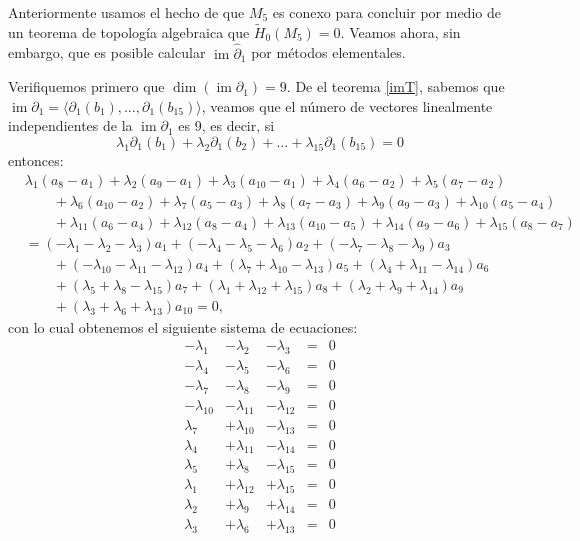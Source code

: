 \documentclass[12pt]{book}
\theoremstyle{definition}
\DeclareMathOperator{\im}{im}
\newcounter{in}
\begin{document}
Anteriormente usamos el hecho de que $M_{5}$ es conexo para concluir
por medio de un teorema de topología algebraica que $\widetilde
H_{0}(M_{5})=0$. Veamos ahora, sin embargo, que es posible
calcular $\im \widehat\partial_{1}$ por métodos elementales.

Verifiquemos primero que $\dim(\im \partial_{1})=9$. De el teorema
\ref{imT}, sabemos que
$\im \partial_{1}=\langle\partial_{1}(b_{1}),\ldots,\partial_{1}(b_{15})\rangle$,
veamos que el número de vectores linealmente independientes de la
$\im \partial_{1}$ es 9, es
decir, si
$$\lambda_{1}\partial_{1}(b_{1})+\lambda_{2}\partial_{1}(b_{2})+\ldots+\lambda_{15}\partial_{1}(b_{15})=0$$
entonces:
\begin{align*}
  &\lambda_{1}(a_{8}-a_{1})+\lambda_{2}(a_{9}-a_{1})+\lambda_{3}(a_{10}-a_{1})+\lambda_{4}(a_{6}-a_{2})+\lambda_{5}(a_{7}-a_{2})\\
  &\qquad
  {}+\lambda_{6}(a_{10}-a_{2})+\lambda_{7}(a_{5}-a_{3})+\lambda_{8}(a_{7}-a_{3})+\lambda_{9}(a_{9}-a_{3})+\lambda_{10}(a_{5}-a_{4})\\
  &\qquad{}+\lambda_{11}(a_{6}-a_{4})+\lambda_{12}(a_{8}-a_{4})+\lambda_{13}(a_{10}-a_{5})+\lambda_{14}(a_{9}-a_{6})+\lambda_{15}(a_{8}-a_{7})\\
  &=(-\lambda_{1}-\lambda_{2}-\lambda_{3})a_{1}+(-\lambda_{4}-\lambda_{5}-\lambda_{6})a_{2}+(-\lambda_{7}-\lambda_{8}-\lambda_{9})a_{3}\\
  &\qquad{}+(-\lambda_{10}-\lambda_{11}-\lambda_{12})a_{4}+(\lambda_{7}+\lambda_{10}-\lambda_{13})a_{5}+(\lambda_{4}+\lambda_{11}-\lambda_{14})a_{6}\\
  &\qquad{}+(\lambda_{5}+\lambda_{8}-\lambda_{15})a_{7}+(\lambda_{1}+\lambda_{12}+\lambda_{15})a_{8}+(\lambda_{2}+\lambda_{9}+\lambda_{14})a_{9}\\
  &\qquad{}+(\lambda_{3}+\lambda_{6}+\lambda_{13})a_{10}=0,
\end{align*}
con lo cual obtenemos el siguiente sistema de ecuaciones:
 \[\begin{array}{rrrrr}
   -\lambda_{1} & -\lambda_{2} & -\lambda_{3} & = & 0 \\
   -\lambda_{4} & -\lambda_{5} & -\lambda_{6} & = & 0 \\
   -\lambda_{7} & -\lambda_{8} & -\lambda_{9} & = & 0 \\
   -\lambda_{10} & -\lambda_{11} & -\lambda_{12} & = & 0 \\
   \lambda_{7} & +\lambda_{10} & -\lambda_{13} & = & 0 \\
   \lambda_{4} & +\lambda_{11} & -\lambda_{14} & = & 0 \\
   \lambda_{5} & +\lambda_{8} & -\lambda_{15} & = & 0 \\
   \lambda_{1} & +\lambda_{12} & +\lambda_{15} & = & 0 \\
   \lambda_{2} & +\lambda_{9} & +\lambda_{14} & = & 0 \\
   \lambda_{3} & +\lambda_{6} & +\lambda_{13} & = & 0 
 \end{array}\]
\end{document}
